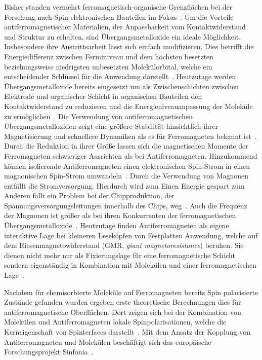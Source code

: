     Bisher standen vermehrt ferromagnetisch-organische Grenzflächen bei der Forschung nach Spin-elektronischen Bauteilen im Fokus~\cite{ma-DJ}.
    Um die Vorteile antiferromagnetischer Materialien, der Anpassbarkeit vom Kontaktwiderstand und Struktur zu erhalten, sind Übergangsmetalloxide ein ideale Möglichkeit.
    Insbesondere ihre Austrittsarbeit lässt sich einfach modifizieren.
    Dies betrifft die Energiedifferenz zwischen Ferminiveau und dem höchsten besetzten beziehungsweise niedrigsten unbesetzten Molekülorbital, welche ein entscheidender Schlüssel für die Anwendung darstellt~\cite{5A_4}.
    Heutzutage werden Übergangsmetalloxide bereits eingesetzt um als Zwischenschichten zwischen Elektrode und organischer Schicht in organischen Bauteilen den Kontaktwiderstand zu reduzieren und die Energieniveauanpassung der Moleküle zu ermöglichen~\cite{IF_11}.
    Die Verwendung von antiferromagnetischen Übergangsmetalloxiden zeigt eine größere Stabilität hinsichtlich ihrer Magnetisierung und schnellere Dynamiken als es für Ferromagneten bekannt ist~\cite{AFM_1}.
    Durch die Reduktion in ihrer Größe lassen sich die magnetischen Momente der Ferromagneten schwieriger Ausrichten als bei Antiferromagneten.
    Hinzukommend können isolierende Antiferromagneten einen elektronischen Spin-Strom in einen magnonischen Spin-Strom umwandeln~\cite{AFM_1}.
    Durch die Verwendung von Magnonen entfällt die Stromversorgung.
    Hierdurch wird zum Einen Energie gespart zum Anderen fällt ein Problem bei der Chipproduktion, der Spannungsversorgungsleitungen innerhalb des Chips, weg~\cite{AFM_3}.
    Auch die Frequenz der Magnonen ist größer als bei ihren Konkurrenten der ferromagnetischen Übergangsmetalloxide~\cite{AFM_5}.
    Heutzutage finden Antiferromagneten als eigene interaktive Lage bei kleineren Leseköpfen von Festplatten Anwendung, welche auf dem Riesenmagnetowiderstand (GMR, \textit{giant magnetoresistance}) beruhen.
    Sie dienen nicht mehr nur als Fixierungslage für eine ferromagnetische Schicht sondern eigenständig in Kombination mit Molekülen und einer ferromagnetischen Lage~\cite{bagrets_single_2012}.

    Nachdem für chemisorbierte Moleküle auf Ferromagneten bereits Spin polarisierte Zustände gefunden wurden \cite{IF_16} ergeben erste theoretische Berechnungen dies für antiferromagnetische Oberflächen.
    Dort zeigen sich bei der Kombination von Molekülen und Antiferromagneten lokale Spinpolarisationen, welche die Kerneigenschaft von Spinterfaces darstellt~\cite{AFM_2}.
    Mit dem Ansatz der Kopplung von Antiferromagneten und Molekülen beschäftigt sich das europäische Forschungsprojekt Sinfonia~\cite{SINFONIA}.

